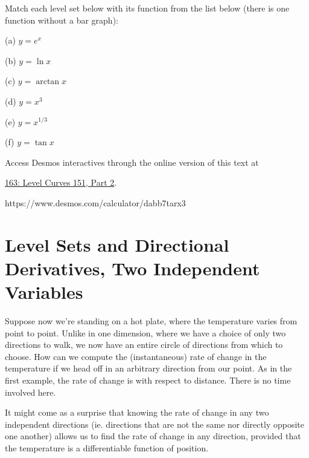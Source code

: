 \documentclass{ximera}
\begin{document}
\begin{exploration} \label{Edsft45t5}
Match each level set below with its function from the list below (there is one function without a bar graph):

(a) $y=e^x$

(b) $y=\ln x$

(c) $y=\arctan x$

(d) $y=x^3$

(e) $y=x^{1/3}$

(f) $y=\tan x$

 
\begin{onlineOnly}
    \begin{center}
\end{center}
\end{onlineOnly}

Access Desmos interactives through the online version of this text at
 
\href{https://www.desmos.com/calculator/qhto2obz1x}{163: Level Curves 151, Part 2}.

https://www.desmos.com/calculator/dabb7tarx3
\end{exploration}



\section{Level Sets and Directional Derivatives, Two Independent Variables}

Suppose now we're standing on a hot plate, where the temperature varies from point to point. Unlike in one dimension, where we have a  choice of only two directions to walk, we now have an entire circle of directions from which to choose. How can we compute the (instantaneous) rate of change in the temperature if we head off in an arbitrary direction from our point. As in the first example, the rate of change is with respect to distance. There is no time involved here.

It might come as a surprise that knowing the rate of change in any two independent directions (ie. directions that are not the same nor directly opposite one another) allows us to find the rate of change in any direction, provided that the temperature is a differentiable function of position.
\end{document}
